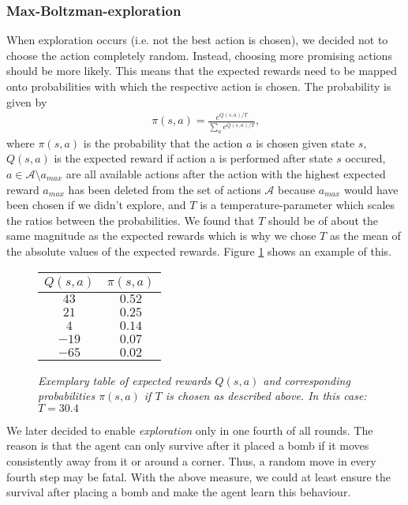 	\subsubsection{Max-Boltzman-exploration}
	When exploration occurs (i.e. not the best action is chosen), we decided not to choose the action completely random. Instead, choosing more promising actions should be more likely. This means that the expected rewards need to be mapped onto probabilities with which the respective action is chosen. The probability is given by 
	\begin{align}
		\pi (s,a) = \frac{e^{Q(s,a)/T}}{\sum_{a} e^{Q(s,a)/T}}\text{,}
	\end{align}
	where $\pi (s,a)$ is the probability that the action $a$ is chosen given state $s$, $Q(s,a)$ is the expected reward if action a is performed after state $s$ occured, $a \in \mathcal{A}\setminus a_{max}$ are all available actions after the action with the highest expected reward $a_{max}$ has been deleted from the set of actions $\mathcal{A}$ because $a_{max}$ would have been chosen if we didn't explore, and $T$ is a temperature-parameter which scales the ratios between the probabilities. We found that $T$ should be of about the same magnitude as the expected rewards which is why we chose $T$ as the mean of the absolute values of the expected rewards. Figure \ref{MB_table} shows an example of this. \par
	\begin{figure}[h]
		\centering
		\begin{tabular}{c|c}
			$Q(s,a)$ & $\pi (s,a)$\\
			\midrule
			$43$ & $0.52$\\
			$21$ & $0.25$\\
			$4$ & $0.14$\\
			$-19$ & $0.07$\\
			$-65$ & $0.02$
		\end{tabular}
	\caption{\textit{Exemplary table of expected rewards $Q(s,a)$ and corresponding probabilities $\pi (s,a)$ if $T$ is chosen as described above. In this case: $T=30.4$}}
	\label{MB_table}
	\end{figure}
	We later decided to enable \textit{exploration} only in one fourth of all rounds. The reason is that the agent can only survive after it placed a bomb if it moves consistently away from it or around a corner. Thus, a random move in every fourth step may be fatal. With the above measure, we could at least ensure the survival after placing a bomb and make the agent learn this behaviour.
	
